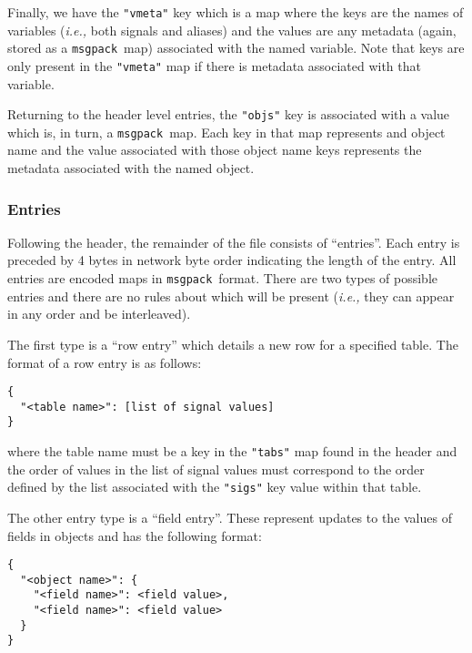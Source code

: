 \documentclass[11pt,a4paper,twocolumn]{article}
\newcommand{\msgpack}{\texttt{msgpack}}
\newcommand{\code}[1]{\texttt{#1}} %
\begin{document}
Finally, we have the \code{"vmeta"} key which is a map where the keys
are the names of variables (\textit{i.e.,} both signals and aliases) and
the values are any metadata (again, stored as a \msgpack\ map)
associated with the named variable.  Note that keys are only present
in the \code{"vmeta"} map if there is metadata associated with that
variable.

Returning to the header level entries, the \code{"objs"} key is
associated with a value which is, in turn, a \msgpack\ map.  Each key
in that map represents and object name and the value associated with
those object name keys represents the metadata associated with the
named object.

\subsubsection{Entries}

Following the header, the remainder of the file consists of
``entries''.  Each entry is preceded by 4 bytes in network byte order
indicating the length of the entry.  All entries are encoded maps in
\msgpack\ format.  There are two types of possible entries and there
are no rules about which will be present (\textit{i.e.,} they can appear
in any order and be interleaved).

The first type is a ``row entry'' which details a new row for a
specified table.  The format of a row entry is as follows:

\begin{verbatim}
{
  "<table name>": [list of signal values]
}
\end{verbatim}

where the table name must be a key in the \code{"tabs"} map found in
the header and the order of values in the list of signal values must
correspond to the order defined by the list associated with the
\code{"sigs"} key value within that table.

The other entry type is a ``field entry''.  These represent updates to
the values of fields in objects and has the following format:

\begin{verbatim}
{
  "<object name>": {
    "<field name>": <field value>,
    "<field name>": <field value>
  }
}
\end{verbatim}
\end{document}
